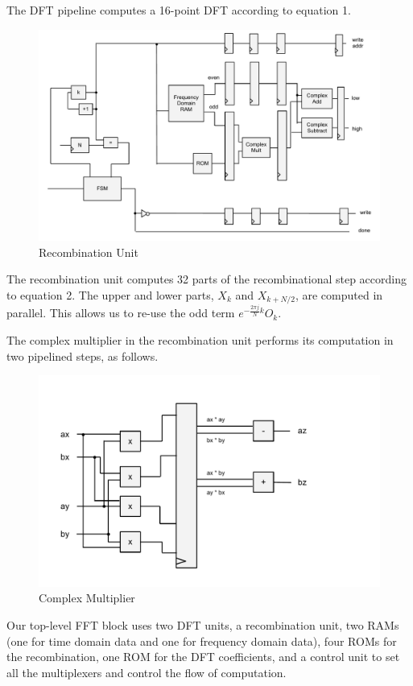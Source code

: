 \documentclass{article}
\begin{document}
The DFT pipeline computes a 16-point DFT according to equation 1. 

\begin{figure}[H]
	\centering
	\includegraphics[scale=0.3]{recombinator}
	\caption{Recombination Unit}
\end{figure}

The recombination unit computes 32 parts of the recombinational step 
according to equation 2. The upper and lower parts, \(X_k\) and 
\(X_{k + N / 2}\), are computed in parallel. This allows us to re-use the 
odd term \(e^{-\frac{2\pi j}{N}k} O_k\).

The complex multiplier in the recombination unit performs its computation
in two pipelined steps, as follows.

\begin{figure}[H]
	\centering
	\includegraphics[scale=0.3]{complex-mult}
	\caption{Complex Multiplier}
\end{figure}

Our top-level FFT block uses two DFT units, a recombination unit,
two RAMs (one for time domain data and one for frequency domain data),
four ROMs for the recombination, one ROM for the DFT coefficients, and
a control unit to set all the multiplexers and control the flow of
computation.
\end{document}

